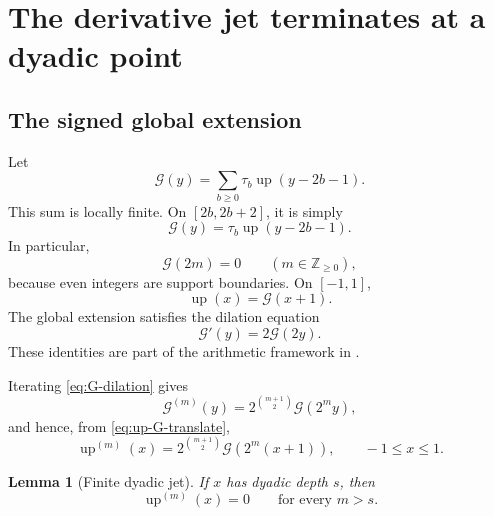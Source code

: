 \documentclass[11pt]{article}
\newtheorem{lemma}[lemma]{Lemma}
\theoremstyle{definition}
\theoremstyle{remark}
\newcommand{\Z}{\mathbb Z}
\newcommand{\rv}{\operatorname{up}}
\newcommand{\Global}{\mathcal G}
\begin{document}
\section{The derivative jet terminates at a dyadic point}

\subsection{The signed global extension}

Let
\begin{equation}
 \Global(y)=\sum_{b\ge0}\tau_b\rv(y-2b-1).
 \label{eq:global-extension}
\end{equation}
This sum is locally finite.  On \([2b,2b+2]\), it is simply
\begin{equation}
 \Global(y)=\tau_b\rv(y-2b-1).
 \label{eq:global-block}
\end{equation}
In particular,
\begin{equation}
 \Global(2m)=0\qquad(m\in\Z_{\ge0}),
 \label{eq:G-even-zero}
\end{equation}
because even integers are support boundaries.  On \([-1,1]\),
\begin{equation}
 \rv(x)=\Global(x+1).
 \label{eq:up-G-translate}
\end{equation}
The global extension satisfies the dilation equation
\begin{equation}
 \Global'(y)=2\Global(2y).
 \label{eq:G-dilation}
\end{equation}
These identities are part of the arithmetic framework in
\cite{proveit-primary,arias2018}.

Iterating \cref{eq:G-dilation} gives
\begin{equation}
 \Global^{(m)}(y)=2^{\binom{m+1}{2}}\Global(2^m y),
 \label{eq:G-derivatives}
\end{equation}
and hence, from \cref{eq:up-G-translate},
\begin{equation}
 \boxed{
 \rv^{(m)}(x)=2^{\binom{m+1}{2}}
 \Global\!\left(2^m(x+1)\right),
 \qquad -1\le x\le1.}
 \label{eq:up-derivatives-G}
\end{equation}

\begin{lemma}[Finite dyadic jet]
\label{lem:dyadic-jet}
If \(x\) has dyadic depth \(s\), then
\begin{equation}
 \rv^{(m)}(x)=0\qquad\text{for every }m>s.
 \label{eq:dyadic-derivative-zero}
\end{equation}
\end{lemma}
\end{document}
